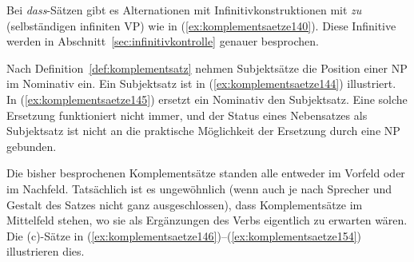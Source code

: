 Bei \textit{dass}-Sätzen gibt es Alternationen mit Infinitivkonstruktionen mit \textit{zu} (selbständigen infiniten VP) wie in (\ref{ex:komplementsaetze140}).
Diese Infinitive werden in Abschnitt~\ref{sec:infinitivkontrolle} genauer besprochen.

\begin{exe}
  \ex\label{ex:komplementsaetze140}
  \begin{xlist}
  \end{xlist}
\end{exe}

Nach Definition~\ref{def:komplementsatz} nehmen Subjektsätze die Position einer NP im Nominativ ein.
Ein Subjektsatz ist in (\ref{ex:komplementsaetze144}) illustriert.
In (\ref{ex:komplementsaetze145}) ersetzt ein Nominativ den Subjektsatz.
Eine solche Ersetzung funktioniert nicht immer, und der Status eines Nebensatzes als Subjektsatz ist nicht an die praktische Möglichkeit der Ersetzung durch eine NP gebunden.

\begin{exe}
  \ex\label{ex:komplementsaetze143}
  \begin{xlist}
  \end{xlist}
\end{exe}

Die bisher besprochenen Komplementsätze standen alle entweder im Vorfeld oder im Nachfeld.
Tatsächlich ist es ungewöhnlich (wenn auch je nach Sprecher und Gestalt des Satzes nicht ganz ausgeschlossen), dass Komplementsätze im Mittelfeld stehen, wo sie als Ergänzungen des Verbs eigentlich zu erwarten wären.
Die (c)-Sätze in (\ref{ex:komplementsaetze146})--(\ref{ex:komplementsaetze154}) illustrieren dies.

